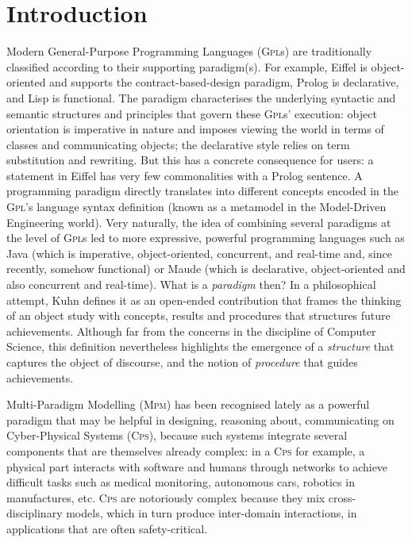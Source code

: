 \section{Introduction}
\label{sec:Introduction}

Modern General-Purpose Programming Languages (\textsc{Gpl}s) are traditionally 
classified according to their supporting paradigm(s). For example, Eiffel is 
object-oriented and supports the contract-based-design paradigm, Prolog is declarative, and Lisp is functional. The paradigm 
characterises the underlying syntactic and semantic structures and principles that govern 
these \textsc{Gpl}s' execution: object orientation is imperative in nature and 
imposes viewing the world in terms of classes and communicating objects; the 
declarative style relies on term substitution and rewriting. But this has a 
concrete consequence for users: a statement in Eiffel has very few 
commonalities with a Prolog sentence. A programming paradigm directly 
translates into different concepts encoded in the \textsc{Gpl}'s language 
syntax definition (known as a metamodel in the Model-Driven Engineering world). Very 
naturally, the idea of combining several paradigms at the level of 
\textsc{Gpl}s led to more expressive, powerful programming languages such as Java 
(which is imperative, object-oriented, concurrent, and real-time and, since 
recently, somehow functional) or Maude (which is declarative, object-oriented and 
also concurrent and real-time). 
What is a \emph{paradigm} then? In a philosophical attempt, Kuhn 
\cite{B:Kuhn:2012} defines it as an open-ended contribution that frames the 
thinking of an object study with concepts, results and procedures that 
structures future achievements. Although far from the concerns in the discipline of Computer Science, this definition nevertheless highlights the emergence of 
a \emph{structure} that captures the object of discourse, and the notion of 
\emph{procedure} that guides achievements. 

Multi-Paradigm Modelling (\textsc{Mpm}) has been recognised lately as a 
powerful paradigm that may be helpful in designing, reasoning about, 
communicating on Cyber-Physical Systems (\textsc{Cps}), because such systems 
integrate several components that are themselves already complex: in 
a \textsc{Cps} for example, a physical part interacts with software and humans through 
networks to achieve difficult tasks such as medical monitoring, autonomous 
cars, robotics in manufactures, etc. \textsc{Cps} are notoriously complex 
because they mix cross-disciplinary models, which in turn produce inter-domain 
interactions, in applications that are often safety-critical. 

